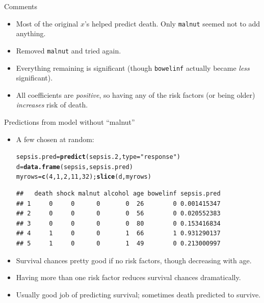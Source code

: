 \documentclass[unknownkeysallowed]{beamer}\usepackage[]{graphicx}\usepackage[]{color}
\makeatletter
\newcommand{\hlnum}[1]{\textcolor[rgb]{0.686,0.059,0.569}{#1}}%
\newcommand{\hlstr}[1]{\textcolor[rgb]{0.192,0.494,0.8}{#1}}%
\newcommand{\hlstd}[1]{\textcolor[rgb]{0.345,0.345,0.345}{#1}}%
\newcommand{\hlkwb}[1]{\textcolor[rgb]{0.69,0.353,0.396}{#1}}%
\newcommand{\hlkwc}[1]{\textcolor[rgb]{0.333,0.667,0.333}{#1}}%
\newcommand{\hlkwd}[1]{\textcolor[rgb]{0.737,0.353,0.396}{\textbf{#1}}}%
\newenvironment{kframe}{%
 \def\at@end@of@kframe{}%
 \ifinner\ifhmode%
  \def\at@end@of@kframe{\end{minipage}}%
  \begin{minipage}{\columnwidth}%
 \fi\fi%
 \def\FrameCommand##1{\hskip\@totalleftmargin \hskip-\fboxsep
 \colorbox{shadecolor}{##1}\hskip-\fboxsep
     \hskip-\linewidth \hskip-\@totalleftmargin \hskip\columnwidth}%
 \MakeFramed {\advance\hsize-\width
   \@totalleftmargin\z@ \linewidth\hsize
   \@setminipage}}%
 {\par\unskip\endMakeFramed%
 \at@end@of@kframe}
\newenvironment{knitrout}{}{} %
\makeatother
\begin{document}
\begin{frame}[fragile]{Comments}

  \begin{itemize}
\item Most of the original $x$'s helped predict death. Only \texttt{malnut} seemed not to add anything.
\item Removed \texttt{malnut} and tried again.
\item Everything remaining is significant (though \texttt{bowelinf}
  actually became \emph{less} significant).
\item All coefficients are \emph{positive}, so having any of the risk
  factors (or being older)
  \emph{increases} risk of death.  
\end{itemize}

\end{frame}

\begin{frame}[fragile]{Predictions from model without ``malnut''}
  
  \begin{itemize}
  \item A few chosen at random:

\begin{knitrout}\footnotesize
{}\color{fgcolor}\begin{kframe}
\begin{alltt}
\hlstd{sepsis.pred}\hlkwb{=}\hlkwd{predict}\hlstd{(sepsis.2,}\hlkwc{type}\hlstd{=}\hlstr{"response"}\hlstd{)}
\hlstd{d}\hlkwb{=}\hlkwd{data.frame}\hlstd{(sepsis,sepsis.pred)}
\hlstd{myrows}\hlkwb{=}\hlkwd{c}\hlstd{(}\hlnum{4}\hlstd{,}\hlnum{1}\hlstd{,}\hlnum{2}\hlstd{,}\hlnum{11}\hlstd{,}\hlnum{32}\hlstd{) ;} \hlkwd{slice}\hlstd{(d,myrows)}
\end{alltt}
\begin{verbatim}
##   death shock malnut alcohol age bowelinf sepsis.pred
## 1     0     0      0       0  26        0 0.001415347
## 2     0     0      0       0  56        0 0.020552383
## 3     0     0      0       0  80        0 0.153416834
## 4     1     0      0       1  66        1 0.931290137
## 5     1     0      0       1  49        0 0.213000997
\end{verbatim}
\end{kframe}
\end{knitrout}

\item Survival chances pretty good if no risk factors, though decreasing with age.
\item Having more than one risk factor reduces survival chances dramatically.
\item Usually good job of predicting survival; sometimes death predicted to survive.
  \end{itemize}
  
\end{frame}
\end{document}
